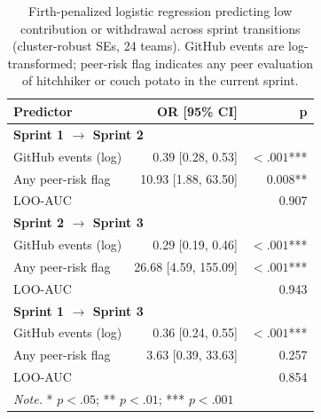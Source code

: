 \begin{table}[ht]
\centering
\scriptsize
\setlength{\tabcolsep}{4pt}
\renewcommand{\arraystretch}{0.88}
\caption{Firth-penalized logistic regression predicting low contribution or withdrawal across sprint transitions (cluster-robust SEs, 24 teams). GitHub events are log-transformed; peer-risk flag indicates any peer evaluation of hitchhiker or couch potato in the current sprint.}
\label{tab:firth_combined}
\begin{tabular}{l r r}
\toprule
\textbf{Predictor} & \textbf{OR [95\% CI]} & \textbf{p} \\
\midrule
\multicolumn{3}{l}{\textbf{Sprint 1 $\to$ Sprint 2}} \\
\midrule
GitHub events (log) & 0.39 [0.28, 0.53] & $< .001$*** \\
Any peer-risk flag  & 10.93 [1.88, 63.50] & 0.008** \\
LOO-AUC             & \multicolumn{2}{r}{0.907} \\
\midrule
\multicolumn{3}{l}{\textbf{Sprint 2 $\to$ Sprint 3}} \\
\midrule
GitHub events (log) & 0.29 [0.19, 0.46] & $< .001$*** \\
Any peer-risk flag  & 26.68 [4.59, 155.09] & $< .001$*** \\
LOO-AUC             & \multicolumn{2}{r}{0.943} \\
\midrule
\multicolumn{3}{l}{\textbf{Sprint 1 $\to$ Sprint 3}} \\
\midrule
GitHub events (log) & 0.36 [0.24, 0.55] & $< .001$*** \\
Any peer-risk flag  & 3.63 [0.39, 33.63] & 0.257 \\
LOO-AUC             & \multicolumn{2}{r}{0.854} \\
\midrule
\multicolumn{3}{l}{\textit{Note.} * $p < .05$; ** $p < .01$; *** $p < .001$} \\
\bottomrule
\end{tabular}
\end{table}

